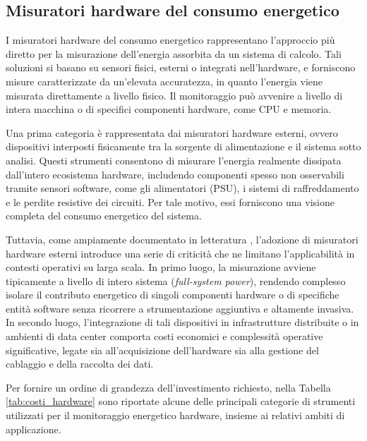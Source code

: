 \subsection{Misuratori hardware del consumo energetico}

I misuratori hardware del consumo energetico rappresentano l’approccio più diretto
per la misurazione dell’energia assorbita da un sistema di calcolo.
Tali soluzioni si basano su sensori fisici, esterni o integrati nell’hardware, e
forniscono misure caratterizzate da un’elevata accuratezza, in quanto l’energia viene
misurata direttamente a livello fisico.
Il monitoraggio può avvenire a livello di intera macchina o di specifici componenti
hardware, come CPU e memoria.

Una prima categoria è rappresentata dai misuratori hardware esterni, ovvero
dispositivi interposti fisicamente tra la sorgente di alimentazione e il sistema
sotto analisi.
Questi strumenti consentono di misurare l’energia realmente dissipata dall’intero
ecosistema hardware, includendo componenti spesso non osservabili tramite sensori
software, come gli alimentatori (PSU), i sistemi di raffreddamento e le perdite
resistive dei circuiti.
Per tale motivo, essi forniscono una visione completa del consumo energetico del
sistema.

Tuttavia, come ampiamente documentato in letteratura \cite{freina2024energysurvey}, l’adozione di misuratori
hardware esterni introduce una serie di criticità che ne limitano l’applicabilità in
contesti operativi su larga scala.
In primo luogo, la misurazione avviene tipicamente a livello di intero sistema
(\textit{full-system power}), rendendo complesso isolare il contributo energetico di
singoli componenti hardware o di specifiche entità software senza ricorrere a
strumentazione aggiuntiva e altamente invasiva.
In secondo luogo, l’integrazione di tali dispositivi in infrastrutture distribuite o
in ambienti di data center comporta costi economici e complessità operative
significative, legate sia all’acquisizione dell’hardware sia alla gestione del
cablaggio e della raccolta dei dati.

Per fornire un ordine di grandezza dell’investimento richiesto, nella Tabella
\ref{tab:costi_hardware} sono riportate alcune delle principali categorie di strumenti
utilizzati per il monitoraggio energetico hardware, insieme ai relativi ambiti di
applicazione.

